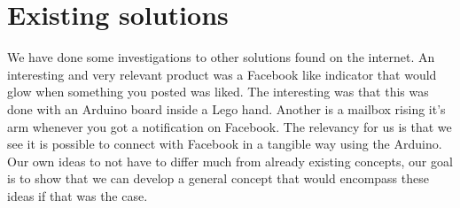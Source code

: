 \section{Existing solutions}

We have done some investigations to other solutions found on the internet. An interesting and very relevant product was a Facebook like indicator that would glow when something you posted was liked. The interesting was that this was done with an Arduino board inside a Lego hand. Another is a mailbox rising it’s arm whenever you got a notification on Facebook. The relevancy for us is that we see it is possible to connect with Facebook in a tangible way using the Arduino. Our own ideas to not have to differ much from already existing concepts, our goal is to show that we can develop a general concept that would encompass these ideas if that was the case. 